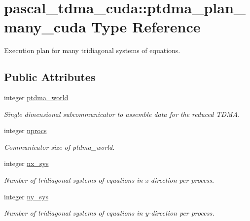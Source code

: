 \hypertarget{structpascal__tdma__cuda_1_1ptdma__plan__many__cuda}{}\section{pascal\+\_\+tdma\+\_\+cuda\+:\+:ptdma\+\_\+plan\+\_\+many\+\_\+cuda Type Reference}
\label{structpascal__tdma__cuda_1_1ptdma__plan__many__cuda}


Execution plan for many tridiagonal systems of equations.  


\subsection*{Public Attributes}
\begin{DoxyCompactItemize}
\item 
integer \hyperlink{structpascal__tdma__cuda_1_1ptdma__plan__many__cuda_ab983f24a2e00981f41ff983e0d81fdb3}{ptdma\+\_\+world}
\begin{DoxyCompactList}\small\item\em Single dimensional subcommunicator to assemble data for the reduced T\+D\+MA. \end{DoxyCompactList}\item 
integer \hyperlink{structpascal__tdma__cuda_1_1ptdma__plan__many__cuda_a706e78d10591f47539ba6edced84a56e}{nprocs}
\begin{DoxyCompactList}\small\item\em Communicator size of ptdma\+\_\+world. \end{DoxyCompactList}\item 
integer \hyperlink{structpascal__tdma__cuda_1_1ptdma__plan__many__cuda_a34475304ac7bdfdd0c9a86798774f515}{nx\+\_\+sys}
\begin{DoxyCompactList}\small\item\em Number of tridiagonal systems of equations in x-\/direction per process. \end{DoxyCompactList}\item 
integer \hyperlink{structpascal__tdma__cuda_1_1ptdma__plan__many__cuda_a14e8282cfbc71ecefdf980d86753b1d3}{ny\+\_\+sys}
\begin{DoxyCompactList}\small\item\em Number of tridiagonal systems of equations in y-\/direction per process. \end{DoxyCompactList}\item 

\end{DoxyCompactItemize}

